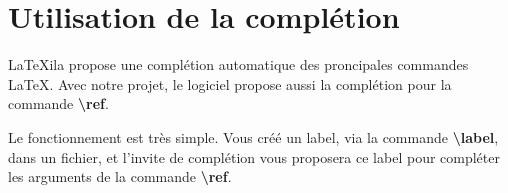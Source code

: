 \documentclass[a4paper,11pt]{report}
\begin{document}
\chapter{Utilisation de la complétion}

\LaTeX{}ila propose une complétion automatique des proncipales commandes \LaTeX{}. Avec notre projet, le logiciel propose aussi la complétion pour la commande \textbf{\textbackslash{}ref}.

Le fonctionnement est très simple. Vous créé un label, via la commande \textbf{\textbackslash{}label}, dans un fichier, et l'invite de complétion vous proposera ce label pour compléter les arguments de la commande \textbf{\textbackslash{}ref}. 
\end{document}
